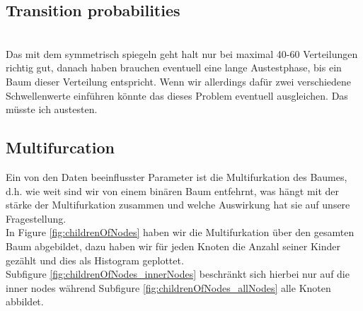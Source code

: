     \subsection{Transition probabilities}
       \\
      Das mit dem symmetrisch spiegeln geht halt nur bei maximal 40-60 Verteilungen richtig gut, danach 
        haben brauchen eventuell eine lange Austestphase, bis ein Baum dieser Verteilung entspricht.
      Wenn wir allerdings dafür zwei verschiedene Schwellenwerte einführen könnte das dieses Problem 
        eventuell ausgleichen. Das müsste ich austesten. 


    \subsection{Multifurcation}
      Ein von den Daten beeinflusster Parameter ist die Multifurkation des Baumes, d.h. wie weit sind 
        wir von einem binären Baum entfehrnt, was hängt mit der stärke der Multifurkation zusammen und 
        welche Auswirkung hat sie auf unsere Fragestellung. \\
      In Figure \ref{fig:childrenOfNodes} haben wir die Multifurkation über den gesamten Baum abgebildet,
        dazu haben wir für jeden Knoten die Anzahl seiner Kinder gezählt und dies als Histogram 
        geplottet. \\
      Subfigure \ref{fig:childrenOfNodes_innerNodes} beschränkt sich hierbei nur auf die inner nodes 
        während Subfigure \ref{fig:childrenOfNodes_allNodes} alle Knoten abbildet. \\

